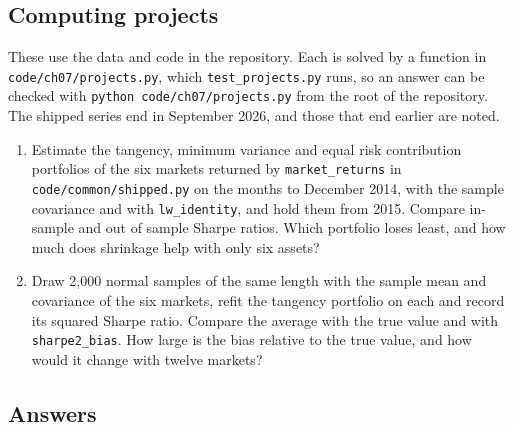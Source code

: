 \begin{chapterrefs}
\subsection*{Computing projects}
\label{sec7:projects}
These use the data and code in the repository. Each is solved by a function in
\texttt{code/ch07/projects.py}, which \texttt{test\_projects.py} runs, so an answer can be
checked with \texttt{python code/ch07/projects.py} from the root of the repository. The
shipped series end in September 2026, and those that end earlier are noted.

\begin{enumerate}[label=\textbf{P7.\arabic*}, leftmargin=*, ref=P7.\arabic*]
\item Estimate the tangency, minimum variance and equal risk contribution portfolios of the six markets
returned by \texttt{market\_returns} in \texttt{code/common/shipped.py} on the months to December 2014, with the
sample covariance and with \texttt{lw\_identity}, and hold them from 2015. Compare in-sample and out of
sample Sharpe ratios. Which portfolio loses least, and how much does shrinkage help with only six assets?
\item Draw 2,000 normal samples of the same length with the sample mean and covariance of the six markets,
refit the tangency portfolio on each and record its squared Sharpe ratio. Compare the average with the
true value and with \texttt{sharpe2\_bias}. How large is the bias relative to the true value, and how
would it change with twelve markets?
\end{enumerate}

\subsection*{Answers}


\end{chapterrefs}
